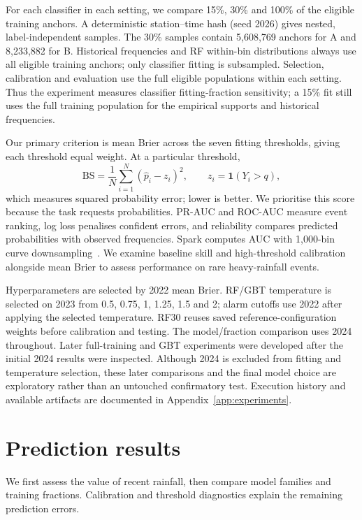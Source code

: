 \documentclass[11pt,a4paper]{article}
\begin{document}
For each classifier in each setting, we compare 15\%, 30\% and 100\% of the eligible training anchors. A deterministic station--time hash (seed 2026) gives nested, label-independent samples. The 30\% samples contain 5,608,769 anchors for A and 8,233,882 for B. Historical frequencies and RF within-bin distributions always use all eligible training anchors; only classifier fitting is subsampled. Selection, calibration and evaluation use the full eligible populations within each setting. Thus the experiment measures classifier fitting-fraction sensitivity; a 15\% fit still uses the full training population for the empirical supports and historical frequencies.

Our primary criterion is mean Brier across the seven fitting thresholds, giving each threshold equal weight. At a particular threshold,
\[
\mathrm{BS}=\frac{1}{N}\sum_{i=1}^{N}(\widehat p_i-z_i)^2,
\qquad z_i=\mathbf1(Y_i>q),
\]
which measures squared probability error; lower is better. We prioritise this score because the task requests probabilities. PR-AUC and ROC-AUC measure event ranking, log loss penalises confident errors, and reliability compares predicted probabilities with observed frequencies. Spark computes AUC with 1,000-bin curve downsampling~\cite{sparkeval}. We examine baseline skill and high-threshold calibration alongside mean Brier to assess performance on rare heavy-rainfall events.

Hyperparameters are selected by 2022 mean Brier. RF/GBT temperature is selected on 2023 from 0.5, 0.75, 1, 1.25, 1.5 and 2; alarm cutoffs use 2022 after applying the selected temperature. RF30 reuses saved reference-configuration weights before calibration and testing. The model/fraction comparison uses 2024 throughout. Later full-training and GBT experiments were developed after the initial 2024 results were inspected. Although 2024 is excluded from fitting and temperature selection, these later comparisons and the final model choice are exploratory rather than an untouched confirmatory test. Execution history and available artifacts are documented in Appendix~\ref{app:experiments}.

\clearpage
\section{Prediction results}
We first assess the value of recent rainfall, then compare model families and training fractions. Calibration and threshold diagnostics explain the remaining prediction errors.
\end{document}
